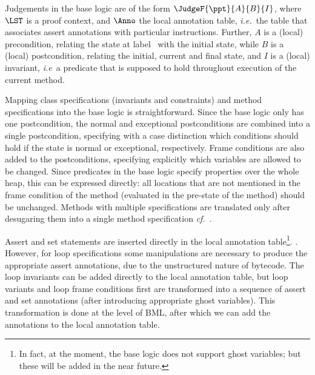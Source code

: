Judgements in the \mobius base logic are of the form
\(\JudgeF{\ppt}{A}{B}{I}\), where \(\LST\) is a proof context,
and \(\Anno\) the local annotation table, \emph{i.e.}~the table that
associates assert annotations with particular instructions. Further,
\(A\) is a (local) precondition, relating the state at label \ppt\
with the initial state, while \(B\) is a (local) postcondition,
relating the initial, current and final state, and \(I\) is a (local)
invariant, \emph{i.e}\ a predicate that is supposed to hold throughout
execution of the current method.

Mapping class specifications (invariants and constraints) and
method specifications into the \mobius base logic is straightforward.
Since the \mobius base logic only has one postcondition, the normal
and exceptional postconditions are combined into a single
postcondition, specifying with a case distinction which conditions
should hold if the state is normal or exceptional, respectively. Frame
conditions are also added to the postconditions, specifying
explicitly which variables are allowed to be changed. Since predicates
in the \mobius base logic specify properties over the whole heap, this
can be expressed directly: all locations that are not mentioned in the
frame condition of the method (evaluated in the pre-state of the
method) should be unchanged. Methods with multiple specifications are
translated only after desugaring them into a single method
specification \emph{cf.}~\cite{RaghavanL00}. 

Assert and set statements are inserted directly in the local
annotation table\footnote{In fact, at the moment, the \mobius base
logic does not support ghost variables; but these will be added in the
near future.}. . However, for loop specifications some manipulations
are necessary to produce the appropriate assert annotations, due to
the unstructured nature of bytecode. The loop invariants can be added
directly to the local annotation table, but loop variants and loop
frame conditions first are transformed into a sequence of assert and
set annotations (after introducing appropriate ghost variables). This
transformation is done at the level of BML, after which we can add
the annotations to the local annotation table.

